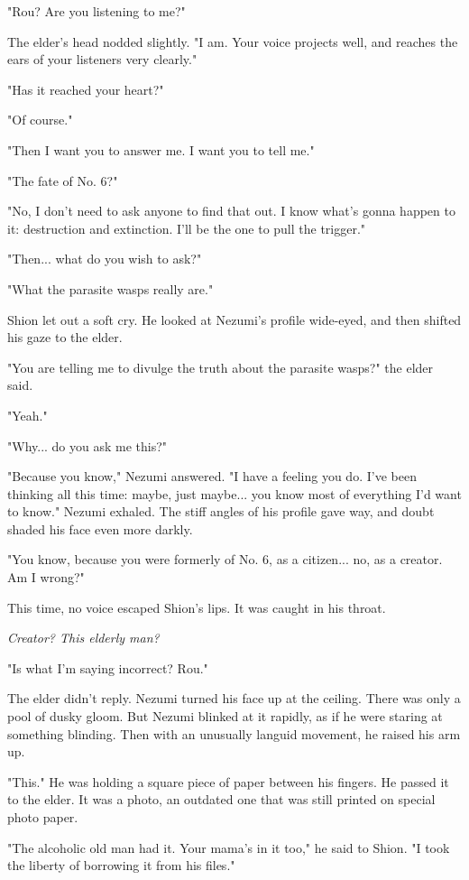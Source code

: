 "Rou? Are you listening to me?"

The elder's head nodded slightly. "I am. Your voice projects well, and
reaches the ears of your listeners very clearly."

"Has it reached your heart?"

"Of course."

"Then I want you to answer me. I want you to tell me."

"The fate of No. 6?"

"No, I don't need to ask anyone to find that out. I know what's gonna
happen to it: destruction and extinction. I'll be the one to pull the
trigger."

"Then... what do you wish to ask?"

"What the parasite wasps really are."

Shion let out a soft cry. He looked at Nezumi's profile wide-eyed, and
then shifted his gaze to the elder.

"You are telling me to divulge the truth about the parasite wasps?" the
elder said.

"Yeah."

"Why... do you ask me this?"

"Because you know," Nezumi answered. "I have a feeling you do. I've been
thinking all this time: maybe, just maybe... you know most of everything
I'd want to know." Nezumi exhaled. The stiff angles of his profile gave
way, and doubt shaded his face even more darkly.

"You know, because you were formerly of No. 6, as a citizen... no, as a
creator. Am I wrong?"

This time, no voice escaped Shion's lips. It was caught in his throat.

\emph{Creator? This elderly man?}

"Is what I'm saying incorrect? Rou."

The elder didn't reply. Nezumi turned his face up at the ceiling. There
was only a pool of dusky gloom. But Nezumi blinked at it rapidly, as if
he were staring at something blinding. Then with an unusually languid
movement, he raised his arm up.

"This." He was holding a square piece of paper between his fingers. He
passed it to the elder. It was a photo, an outdated one that was still
printed on special photo paper.

"The alcoholic old man had it. Your mama's in it too," he said to Shion.
"I took the liberty of borrowing it from his files."


